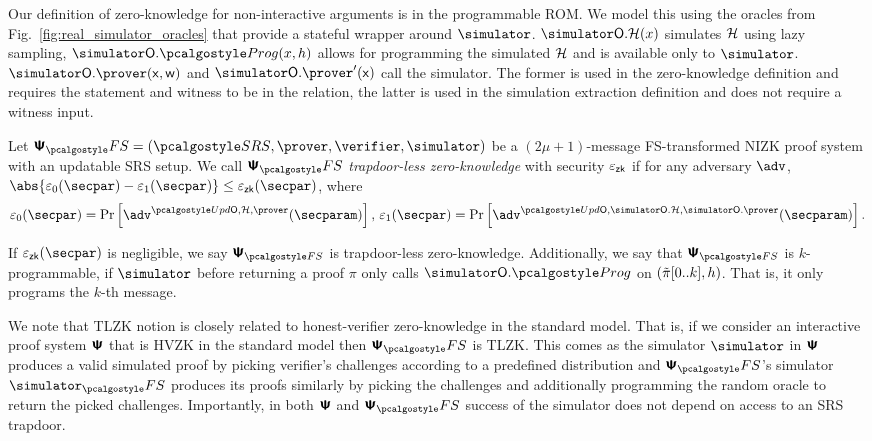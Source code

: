  Our definition of zero-knowledge for non-interactive
arguments is in the programmable ROM.
We model this using the oracles from Fig.~\ref{fig:real_simulator_oracles} that provide a stateful wrapper around $\simulator$.
$\simOH (x)$ simulates $\mathcal{H}$ using lazy sampling, $\simulator\oracleo.\prog(x, h)$ allows for programming the simulated $\mathcal{H}$ and is available only to $\simulator$. $\simOP(\inp, \wit)$ and $\simOP'(\inp)$ call the simulator. The former is used in the zero-knowledge definition and requires the statement and witness to be in the relation, the latter is used in the simulation extraction definition and does not require a witness input.

\begin{definition}
  \label{def:TLZK}
  Let 
  $\psfs = (\SRScer, \prover, \verifier, \simulator)$ be a $(2\mu + 1)$-message FS-transformed NIZK proof system with an updatable SRS setup. %
  We call $\psfs$ \emph{trapdoor-less zero-knowledge} with security $\varepsilon_{\mathsf{zk}}$ if for any
  adversary $\adv$, $\abs{\eps_0(\secpar) - \eps_1(\secpar)} \leq \epszk(\secpar)$, where
  \begin{align*}
    \eps_0 (\secpar) = \Pr\left[ \adv^{\initU, \ro, \prover} (\secparam) \right],\,
    \eps_1 (\secpar)=  \Pr \left[\adv^{\initU, \simOH, \simOP} (\secparam) \right].
  \end{align*}
  
  If $\epszk(\secpar)$ is negligible, we say $\ps_{\fs}$ is trapdoor-less zero-knowledge. Additionally, we say that $\ps_{\fs}$ is $k$-programmable, if  $\simulator$ before returning a proof $\pi$ only calls $\simulator\oracleo.\prog$ on $(\tilde{\pi}[0..k],h)$. That is, it only programs the $k$-th message.
  \end{definition}

  
\begin{remark}
  We note that TLZK notion is closely related to honest-verifier zero-knowledge in the
  standard model. That is, if we consider an interactive proof system $\bm{\mathsf{\Psi}}$
  that is HVZK in the standard model then $\proofsystem_\fs$ is TLZK. This comes as the simulator $\simulator$ in
  $\bm{\mathsf{\Psi}}$ produces a valid simulated proof by picking verifier's challenges
  according to a predefined distribution and $\proofsystem_\fs$'s simulator
  $\simulator_\fs$ produces its proofs similarly by picking the challenges and
  additionally programming the random oracle to return the picked
  challenges. Importantly, in both $\bm{\mathsf{\Psi}}$ and $\proofsystem_\fs$ success of
  the simulator does not depend on access to an SRS trapdoor.
\end{remark}

